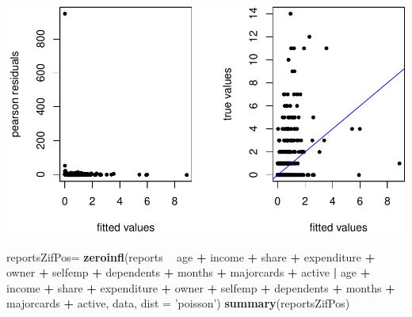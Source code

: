 \documentclass[
]{article}
\newenvironment{Shaded}{\begin{snugshade}}{\end{snugshade}}
\newcommand{\DataTypeTok}[1]{\textcolor[rgb]{0.13,0.29,0.53}{#1}}
\newcommand{\KeywordTok}[1]{\textcolor[rgb]{0.13,0.29,0.53}{\textbf{#1}}}
\newcommand{\NormalTok}[1]{#1}
\newcommand{\OperatorTok}[1]{\textcolor[rgb]{0.81,0.36,0.00}{\textbf{#1}}}
\newcommand{\StringTok}[1]{\textcolor[rgb]{0.31,0.60,0.02}{#1}}
\begin{document}
\includegraphics{stats504_hw1_files/figure-latex/unnamed-chunk-8-1.pdf}

\begin{Shaded}
\begin{Highlighting}[]
\NormalTok{reportsZifPos=}\StringTok{ }\KeywordTok{zeroinfl}\NormalTok{(reports }\OperatorTok{~}\StringTok{ }\NormalTok{age }\OperatorTok{+}\StringTok{ }\NormalTok{income }\OperatorTok{+}\StringTok{ }\NormalTok{share }\OperatorTok{+}\StringTok{ }\NormalTok{expenditure }\OperatorTok{+}\StringTok{ }\NormalTok{owner }\OperatorTok{+}\StringTok{ }
\StringTok{                          }\NormalTok{selfemp }\OperatorTok{+}\StringTok{ }\NormalTok{dependents }\OperatorTok{+}\StringTok{ }\NormalTok{months }\OperatorTok{+}\StringTok{ }\NormalTok{majorcards }\OperatorTok{+}\StringTok{ }\NormalTok{active }\OperatorTok{|}\StringTok{ }
\StringTok{                          }\NormalTok{age }\OperatorTok{+}\StringTok{ }\NormalTok{income }\OperatorTok{+}\StringTok{ }\NormalTok{share }\OperatorTok{+}\StringTok{ }\NormalTok{expenditure }\OperatorTok{+}\StringTok{ }\NormalTok{owner }\OperatorTok{+}\StringTok{ }
\StringTok{                          }\NormalTok{selfemp }\OperatorTok{+}\StringTok{ }\NormalTok{dependents }\OperatorTok{+}\StringTok{ }\NormalTok{months }\OperatorTok{+}\StringTok{ }\NormalTok{majorcards }\OperatorTok{+}\StringTok{ }\NormalTok{active, }
\NormalTok{                        data, }\DataTypeTok{dist =} \StringTok{'poisson'}\NormalTok{)}
\KeywordTok{summary}\NormalTok{(reportsZifPos)}
\end{Highlighting}
\end{Shaded}
\end{document}
